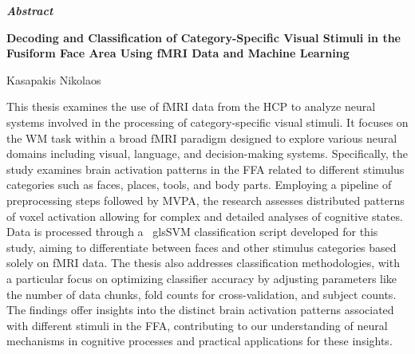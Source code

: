 \thispagestyle{plain}
\vspace*{\fill}
\begin{center}
    \LARGE
    \textit{\textbf{Abstract}}
        
    \vspace{0.4cm}
    \large
    \textbf{Decoding and Classification of Category-Specific Visual Stimuli in the Fusiform Face Area Using fMRI Data and Machine Learning}
        
    \vspace{0.4cm}
    Kasapakis Nikolaos
\end{center}
\normalsize

\vspace{0.9cm}

This thesis examines the use of \gls{fMRI} data from the \gls{HCP} to analyze neural systems involved in the processing of category-specific visual stimuli. It focuses on the \gls{WM} task within a broad \gls{fMRI} paradigm designed to explore various neural domains including visual, language, and decision-making systems. Specifically, the study examines brain activation patterns in the \gls{FFA} related to different stimulus categories such as faces, places, tools, and body parts. Employing a pipeline of preprocessing steps followed by \gls{MVPA}, the research assesses distributed patterns of voxel activation allowing for complex and detailed analyses of cognitive states. Data is processed through a \	gls{SVM} classification script developed for this study, aiming to differentiate between faces and other stimulus categories based solely on \gls{fMRI} data. The thesis also addresses classification methodologies, with a particular focus on optimizing classifier accuracy by adjusting parameters like the number of data chunks, fold counts for cross-validation, and subject counts. The findings offer insights into the distinct brain activation patterns associated with different stimuli in the \gls{FFA}, contributing to our understanding of neural mechanisms in cognitive processes and practical applications for these insights.

\vspace*{\fill}

